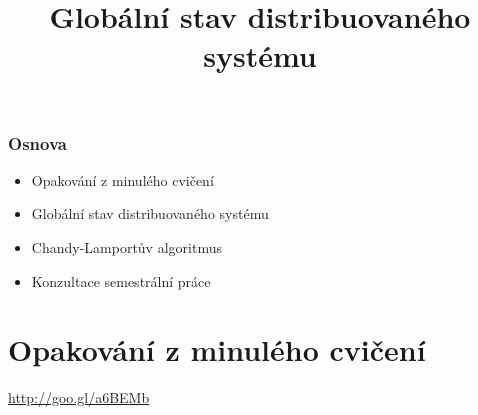 \documentclass[usenames,dvipsnames,9pt]{beamer}
\title{Globální stav distribuovaného systému}
\date{}
\institute{B4B36PDV -- Paralelní a distribuované výpočty}
\begin{document}
\maketitle

\begin{frame}
  \frametitle{Osnova}
  \begin{itemize}
   \item Opakování z minulého cvičení\\[1.5em]
    \item Globální stav distribuovaného systému
    \item Chandy-Lamportův algoritmus\\[1.5em]
    \item Konzultace semestrální práce
  \end{itemize}
\end{frame}

\section{Opakování z minulého cvičení}

\begin{frame}[standout]
 \Huge
 \url{http://goo.gl/a6BEMb}
\end{frame}
\end{document}

